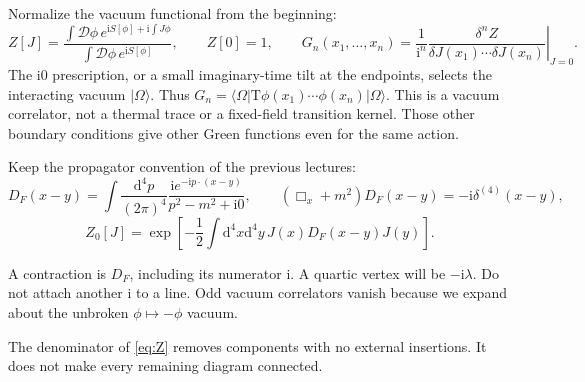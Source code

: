 \documentclass[11pt]{article}
\newcommand{\dd}{\mathrm d}
\newcommand{\ii}{\mathrm i}
\newcommand{\D}{\mathcal D}
\newcommand{\Tord}{\mathrm T}
\newcommand{\ket}[1]{\lvert#1\rangle}
\newcommand{\intp}{\int\!\frac{\dd^4p}{(2\pi)^4}}
\begin{document}
Normalize the vacuum functional from the beginning:
\begin{equation}
 Z[J]=\frac{\int\D\phi\,e^{\ii S[\phi]+\ii\int J\phi}}
 {\int\D\phi\,e^{\ii S[\phi]}},\qquad Z[0]=1,\qquad
 G_n(x_1,\ldots,x_n)=\left.\frac{1}{\ii^n}
 \frac{\delta^n Z}{\delta J(x_1)\cdots\delta J(x_n)}\right|_{J=0}.
 \label{eq:Z}
\end{equation}
The \(\ii0\) prescription, or a small imaginary-time tilt at the
endpoints, selects the interacting vacuum \(\ket{\Omega}\).
Thus \(G_n=\langle\Omega|\Tord\phi(x_1)\cdots\phi(x_n)|\Omega\rangle\).
This is a vacuum correlator, not a thermal trace or a fixed-field
transition kernel. Those other boundary conditions give other Green
functions even for the same action.

Keep the propagator convention of the previous lectures:
\begin{equation}
 D_F(x-y)=\intp\frac{\ii e^{-\ii p\cdot(x-y)}}{p^2-m^2+\ii0},
 \qquad (\Box_x+m^2)D_F(x-y)=-\ii\delta^{(4)}(x-y),
 \label{eq:DF}
\end{equation}
\begin{equation}
 Z_0[J]=\exp\!\left[-\frac12\int\dd^4x\dd^4y\,
 J(x)D_F(x-y)J(y)\right].                         \label{eq:freeZ}
\end{equation}
\begin{keyidea}
A contraction is \(D_F\), including its numerator \(\ii\).
A quartic vertex will be \(-\ii\lambda\).
Do not attach another \(\ii\) to a line. Odd vacuum correlators vanish
because we expand about the unbroken \(\phi\mapsto-\phi\) vacuum.
\end{keyidea}
The denominator of \eqref{eq:Z} removes components with no external
insertions. It does not make every remaining diagram connected.
\end{document}
